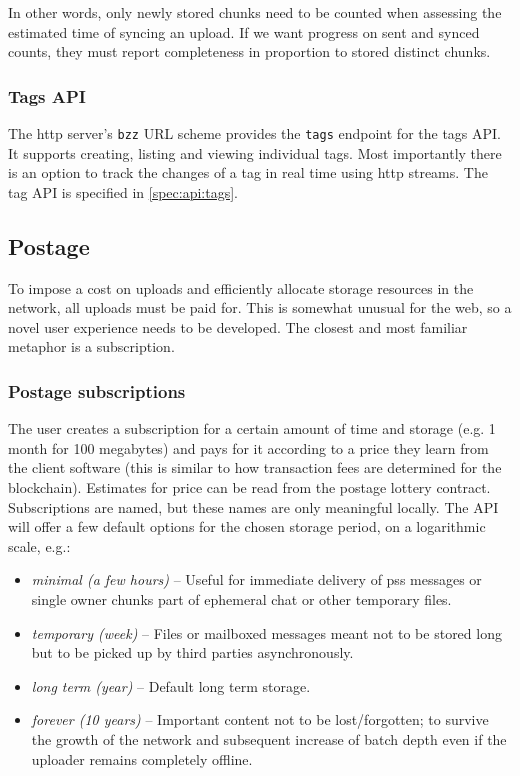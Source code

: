 In other words, only newly stored chunks need to be counted when assessing the estimated time of syncing an upload. If we want progress on sent and synced counts, they must report completeness in proportion to stored distinct chunks.

\subsubsection{Tags API} 

The http server's \lstinline{bzz} URL scheme provides the \lstinline{tags} endpoint for the tags API. It supports creating, listing and viewing individual tags. Most importantly there is an option to track the changes of a tag in real time using http streams. The tag API is specified in \ref{spec:api:tags}.



\subsection{Postage \statusgreen}\label{sec:postage-ux}

To impose a cost on uploads and efficiently allocate storage resources in the network, all uploads must be paid for.  This is somewhat unusual for the web, so a novel user experience needs to be developed. The closest and most familiar metaphor is a subscription.

\subsubsection{Postage subscriptions}

The user creates a subscription for a certain amount of time and storage (e.g. 1 month for 100 megabytes) and pays for it according to a price they learn from the client software (this is similar to how transaction fees are determined for the blockchain). Estimates for price can be read from the postage lottery contract. Subscriptions are named, but these names are only meaningful locally. The API will offer a few default options for the chosen storage period, on a logarithmic scale, e.g.: 

\begin{itemize}
\item \emph{minimal (a few hours)} -- Useful for immediate delivery of pss messages or single owner chunks part of ephemeral chat or other temporary files.
\item \emph{temporary (week)} -- Files or mailboxed messages meant not to be stored long but to be picked up by third parties asynchronously.
\item \emph{long term (year)} -- Default long term storage. 
\item \emph{forever (10 years)} -- Important content not to be lost/forgotten; to survive the growth of the network and subsequent increase of batch depth even if the uploader remains completely offline.
\end{itemize}

